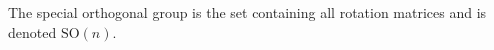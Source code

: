 \documentclass[preview]{standalone}
\begin{document}
\begin{center}
The special orthogonal group is the set containing all rotation matrices and is denoted $\text{SO}(n)$.
\end{center}
\end{document}
